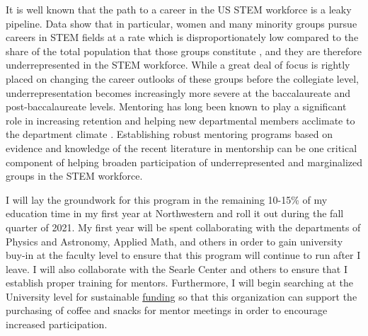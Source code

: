 \documentclass[aasms,11pt]{article}
\begin{document}
It is well known that the path to a career in the US STEM workforce is a leaky pipeline.
Data show that in particular, women and many minority groups pursue careers in STEM fields at a rate which is disproportionately low compared to the share of the total population that those groups constitute \citep{corbett&hill2015, nsf2019}, and they are therefore underrepresented in the STEM workforce.
While a great deal of focus is rightly placed on changing the career outlooks of these groups before the collegiate level, underrepresentation becomes increasingly more severe at the baccalaureate and post-baccalaureate levels.
Mentoring has long been known to play a significant role in increasing retention and helping new departmental members acclimate to the department climate \citep{hunt&michael1983}.
Establishing robust mentoring programs based on evidence and knowledge of the recent literature in mentorship \citep[as in e.g.,][]{crisp&all2009, crisp&all2017} can be one critical component of helping broaden participation of underrepresented and marginalized groups in the STEM workforce.

I will lay the groundwork for this program in the remaining 10-15\% of my education time in my first year at Northwestern and roll it out during the fall quarter of 2021.
My first year will be spent collaborating with the departments of Physics and Astronomy, Applied Math, and others in order to gain university buy-in at the faculty level to ensure that this program will continue to run after I leave.
I will also collaborate with the Searle Center and others to ensure that I establish proper training for mentors.
Furthermore, I will begin searching at the University level for sustainable \href{https://www.northwestern.edu/studentorgs/org-officers/funding/index.html}{funding} so that this organization can support the purchasing of coffee and snacks for mentor meetings in order to encourage increased participation.
\end{document}
